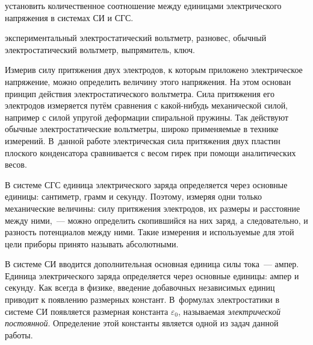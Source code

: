 \label{lab:absvolt}

\begin{lab:aim}
	установить количественное соотношение между единицами электрического
напряжения в системах СИ и СГС.
\end{lab:aim}

\begin{lab:equipment}
	экспериментальный электростатический вольтметр, разновес, обычный
электростатический вольтметр, выпрямитель, ключ.
\end{lab:equipment}

Измерив силу притяжения двух электродов, к которым приложено электрическое
напряжение, можно определить величину этого напряжения. На этом основан принцип
действия электростатического вольтметра. Сила притяжения его электродов измеряется
путём сравнения с какой-нибудь механической силой, например с силой упругой
деформации спиральной пружины. Так действуют обычные электростатические
вольтметры, широко применяемые в технике измерений. В~данной работе
электрическая сила притяжения двух пластин плоского конденсатора сравнивается
с весом гирек при помощи аналитических весов.

В системе СГС единица электрического заряда определяется через основные единицы:
сантиметр, грамм и секунду. Поэтому, измеряя одни только механические
величины: силу притяжения электродов, их размеры и расстояние между ними,~---
можно определить скопившийся на них заряд, а следовательно, и разность потенциалов
между ними. Такие измерения и используемые для этой цели приборы принято
называть абсолютными.

В системе СИ вводится дополнительная основная единица силы тока~--- ампер.
Единица электрического заряда определяется через основные единицы:
ампер и секунду. Как всегда в физике, введение добавочных независимых единиц
приводит к появлению размерных констант. В~формулах электростатики
в системе СИ появляется размерная константа $\varepsilon_0$, называемая
\emph{электрической постоянной}. Определение этой константы является одной
из задач данной работы.

